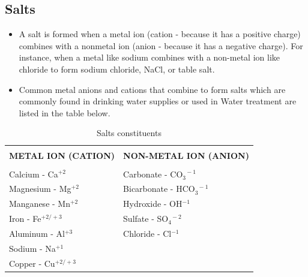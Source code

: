 \subsection{Salts}
\begin{itemize}
\item A salt is formed when a metal ion (cation - because it has a positive charge) combines with a nonmetal ion (anion - because it has a negative charge). For instance, when a metal like sodium combines with a non-metal ion like chloride to form sodium chloride, NaCl, or table salt.  

\item Common metal anions and cations that combine to form salts which are commonly found in drinking water supplies or used in Water treatment are listed in the table below.
\end{itemize}

\begin{table}[h!]    
\begin{center}
     \begin{tabular}{ | m{5cm}  m{5cm} |}
     \hline
           \multicolumn{1}{|c}{} & \multicolumn{1}{c|}{} \\
      \multicolumn{1}{|c}{\textbf{METAL ION (CATION)}} & \multicolumn{1}{c|}{\textbf{NON-METAL ION (ANION)}} \\
            \multicolumn{1}{|c}{} & \multicolumn{1}{c|}{}\\
      Calcium - Ca$^{+2}$ & Carbonate - CO$_3^{\enspace -1}$\\
      Magnesium - Mg$^{+2}$ & Bicarbonate - HCO$_3^{\enspace -1}$\\
      Manganese - Mn$^{+2}$ & Hydroxide - OH$^{-1}$\\
      Iron - Fe$^{+2/+3}$ & Sulfate - SO$_4^{\enspace -2}$\\
      Aluminum - Al$^{+3}$ & Chloride - Cl$^{-1}$\\
      Sodium - Na$^{+1}$ & \\
      Copper - Cu$^{+2/+3}$ & \\
          \hline
                    \end{tabular}
     \caption{Salts constituents}
     \label{Salts constituents}
     
\end{center}
     \end{table}

